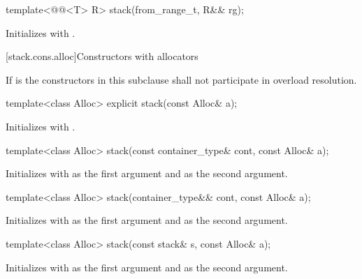 %
\begin{itemdecl}
template<@@<T> R>
  stack(from_range_t, R&& rg);
\end{itemdecl}

\begin{itemdescr}
\pnum
\effects
Initializes  with .
\end{itemdescr}

[stack.cons.alloc]{Constructors with allocators}

\pnum
If  is 
the constructors in this subclause shall not participate in overload resolution.

%
\begin{itemdecl}
template<class Alloc> explicit stack(const Alloc& a);
\end{itemdecl}

\begin{itemdescr}
\pnum
\effects
Initializes  with .
\end{itemdescr}

%
\begin{itemdecl}
template<class Alloc> stack(const container_type& cont, const Alloc& a);
\end{itemdecl}

\begin{itemdescr}
\pnum
\effects
Initializes  with  as the first argument and  as the
second argument.
\end{itemdescr}

%
\begin{itemdecl}
template<class Alloc> stack(container_type&& cont, const Alloc& a);
\end{itemdecl}

\begin{itemdescr}
\pnum
\effects
Initializes  with  as the first argument and 
as the second argument.
\end{itemdescr}

%
\begin{itemdecl}
template<class Alloc> stack(const stack& s, const Alloc& a);
\end{itemdecl}

\begin{itemdescr}
\pnum
\effects
Initializes  with  as the first argument and 
as the second argument.
\end{itemdescr}

